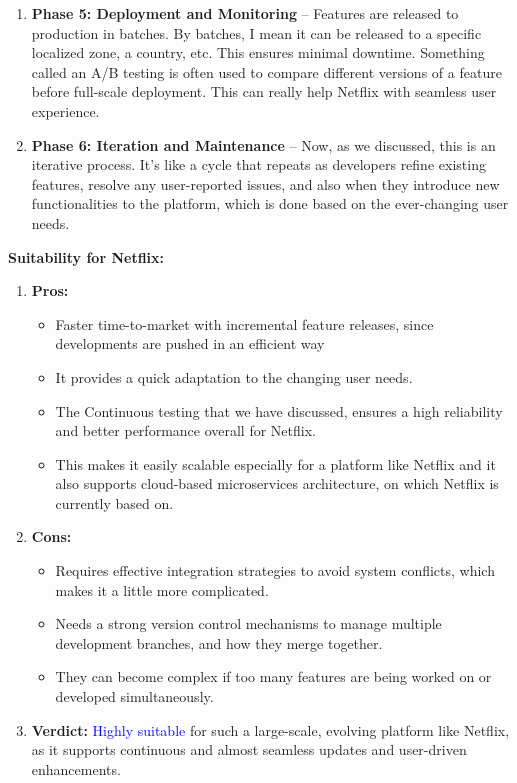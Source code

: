 \documentclass[a4paper,10pt,twoside]{article}
\begin{document}
\begin{enumerate}
    \item\pagebreak \textbf{Phase 5: Deployment and Monitoring} – Features are released to production in batches. By batches, I mean it can be released to a specific localized zone, a country, etc. This ensures minimal downtime. Something called an A/B testing is often used to compare different versions of a feature before full-scale deployment. This can really help Netflix with seamless user experience.
    \item \textbf{Phase 6: Iteration and Maintenance} – Now, as we discussed, this is an iterative process. It’s like a cycle that repeats as developers refine existing features, resolve any user-reported issues, and also when they introduce new functionalities to the platform, which is done based on the ever-changing user needs.
\end{enumerate}
\textbf{Suitability for Netflix:}
\begin{enumerate}
    \item \textbf{Pros:}
    \begin{itemize}
        \item Faster time-to-market with incremental feature releases, since developments are pushed in an efficient way
        \item It provides a quick adaptation to the changing user needs.
        \item The Continuous testing that we have discussed, ensures a high reliability and better performance overall for Netflix.
        \item This makes it easily scalable especially for a platform like Netflix and it also supports cloud-based microservices architecture, on which Netflix is currently based on.
    \end{itemize}
    \item \textbf{Cons:}
    \begin{itemize}
        \item Requires effective integration strategies to avoid system conflicts, which makes it a little more complicated.
        \item Needs a strong version control mechanisms to manage multiple development branches, and how they merge together.
        \item They can become complex if too many features are being worked on or developed simultaneously.
    \end{itemize}
    \item \textbf{Verdict:} \textcolor{Blue}{Highly suitable} for such a large-scale, evolving platform like Netflix, as it supports continuous and almost seamless updates and user-driven enhancements.
\end{enumerate}
\end{document}
